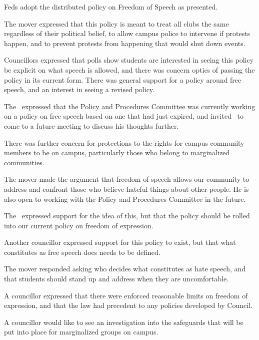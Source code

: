 \begin{motion}
    \birt Feds adopt the distributed policy on Freedom of Speech as presented. 
    \movers{\alex}{\brian}

    The mover expressed that this policy is meant to treat all clubs the
    same regardless of their political belief, to allow campus police to
    intervene if protests happen, and to prevent protests from happening
    that would shut down events.

    Councillors expressed that polls show students are interested in seeing
    this policy be explicit on what speech is allowed, and there was concern
    optics of passing the policy in its current form. There was general support
    for a policy around free speech, and an interest in seeing a revised 
    policy. 

    The \pres\ expressed that the Policy and Procedures Committee was currently
    working on a policy on free speech based on one that had just expired, and
    invited \alex\ to come to a future meeting to discuss his thoughts further. 

    There was further concern for protections to the rights for campus
    community members to be on campus, particularly those who belong to
    marginalized communities.

    The mover made the argument that freedom of speech allows our community 
    to address and confront those who believe hateful things about other 
    people. He is also open to working with the Policy and Procedures 
    Committee in the future. 

    The \pres\ expressed support for the idea of this, but that the policy 
    should be rolled into our current policy on freedom of expression. 

    Another councillor expressed support for this policy to exist, but that
    what constitutes as free speech does needs to be defined. 

    The mover responded asking who decides what constitutes as hate speech, 
    and that students should stand up and address when they are uncomfortable. 

    A councillor expressed that there were enforced reasonable limits on
    freedom of expression, and that the law had precedent to any policies
    developed by Council. 

    A councillor would like to see an investigation into the safeguards that
    will be put into place for marginalized groups on campus. 


\end{motion}
